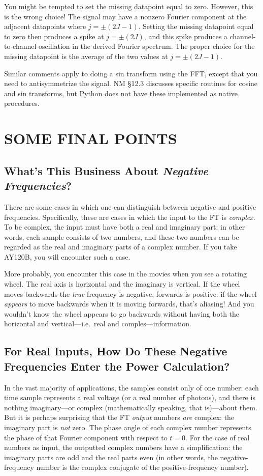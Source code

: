 \documentclass[11pt,preprint]{aastex}
\begin{document}
	You might be tempted to set the missing datapoint equal to
zero. However, this is the wrong choice! The signal may have a nonzero
Fourier component at the adjacent datapoints where $j = \pm (2J-1)$.
Setting the missing datapoint equal to zero then produces a spike at $j =
\pm (2J)$, and this spike produces a channel-to-channel oscillation in
the derived Fourier spectrum. The proper choice for the missing datapoint
is the average of the two values at $j = \pm (2J-1)$.

	Similar comments apply to doing a sin transform using the FFT,
except that you need to antisymmetrize the signal. NM \S 12.3 discusses
specific routines for cosine and sin transforms, but Python does not have
these implemented as native procedures.

\section{SOME FINAL POINTS}

\subsection{What's This Business About {\it Negative Frequencies}?}

          There are some cases in which one can distinguish between
negative and positive frequencies. Specifically, these are cases in
which the input to the FT is {\it complex}. To be complex, the input
must have both a real and imaginary part: in other words, each sample
consists of two numbers, and these two numbers can be regarded as the
real and imaginary parts of a complex number. If you take AY120B, you
will encounter such a case. 

	More probably, you encounter this case in the movies when you
see a rotating wheel. The real axis is horizontal and the imaginary is
vertical. If the wheel moves backwards the {\it true} frequency is
negative, forwards is positive: if the wheel {\it appears} to move
backwards when it is moving forwards, that's aliasing! And you wouldn't
know the wheel appears to go backwards without having both the
horizontal and vertical---i.e.\ real and comples---information.

\subsection{For Real Inputs, How Do These Negative Frequencies Enter the
Power Calculation?}

          In the vast majority of applications, the samples consist
only of one number: each time sample represents
a real voltage (or a real number of photons), and there is nothing
imaginary---or complex (mathematically speaking, that is)---about them. 
But it is perhaps surprising that the FT {\it output} numbers {\it are}
complex: the imaginary part is {\it not} zero.  The phase angle of each
complex number represents the phase of that Fourier component with
respect to $t=0$.  For the case of real numbers as input, the outputted
complex numbers have a simplification: the imaginary parts are odd and
the real parts even (in other words, the negative-frequency number is
the complex conjugate of the positive-frequency number). 
\end{document}
